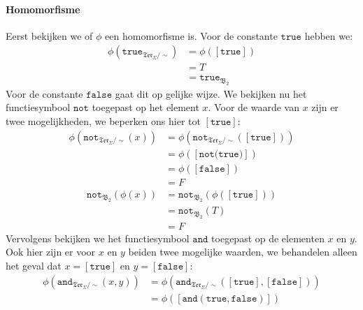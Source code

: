\documentclass[a4paper,11pt]{article}
\begin{document}
\begin{description}
\paragraph{Homomorfisme}

Eerst bekijken we of $\phi$ een homomorfisme is. Voor de constante
$\texttt{true}$ hebben we:
\begin{align*}
\phi(\texttt{true}_{\mathfrak{Ter}_{\Sigma}/\sim}) &= \phi([\texttt{true}]) \\
                                                   &= T \\
                                                   &= \texttt{true}_{\mathfrak{B}_{2}}
\end{align*}
Voor de constante $\texttt{false}$ gaat dit op gelijke wijze. We bekijken nu
het functiesymbool $\texttt{not}$ toegepast op het element $x$. Voor de waarde
van $x$ zijn er twee mogelijkheden, we beperken ons hier tot
$[\texttt{true}]$:
\begin{align*}
\phi(\texttt{not}_{\mathfrak{Ter}_{\Sigma}/\sim}(x)) &= \phi(\texttt{not}_{\mathfrak{Ter}_{\Sigma}/\sim}([\texttt{true}])) \\
                                                     &= \phi([\texttt{not(true)}]) \\
                                                     &= \phi([\texttt{false}]) \\
                                                     &= F
\end{align*}
\begin{align*}
\texttt{not}_{\mathfrak{B}_{2}}(\phi(x)) &= \texttt{not}_{\mathfrak{B}_{2}}(\phi([\texttt{true}])) \\
                                         &= \texttt{not}_{\mathfrak{B}_{2}}(T) \\
                                         &= F
\end{align*}
Vervolgens bekijken we het functiesymbool $\texttt{and}$ toegepast op de
elementen $x$ en $y$. Ook hier zijn er voor $x$ en $y$ beiden twee mogelijke
waarden, we behandelen alleen het geval dat $x = [\texttt{true}]$ en $y =
[\texttt{false}]$:
\begin{align*}
\phi(\texttt{and}_{\mathfrak{Ter}_{\Sigma}/\sim}(x,y)) &= \phi(\texttt{and}_{\mathfrak{Ter}_{\Sigma}/\sim}([\texttt{true}],[\texttt{false}])) \\
                                                       &= \phi([\texttt{and}(\texttt{true},\texttt{false})]) \\

\end{align*}
\end{description}
\end{document}
